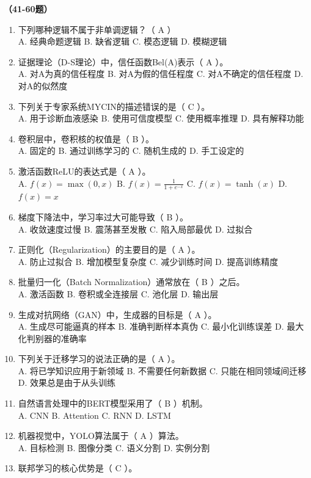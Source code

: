 \vspace{1em}
\textbf{（41-60题）}
\begin{enumerate}[resume,leftmargin=2em,itemsep=1pt]
\item 下列哪种逻辑不属于非单调逻辑？（ A ）
\\ A. 经典命题逻辑 B. 缺省逻辑 C. 模态逻辑 D. 模糊逻辑
\item 证据理论（D-S理论）中，信任函数Bel(A)表示（ A ）。
\\ A. 对A为真的信任程度 B. 对A为假的信任程度 C. 对A不确定的信任程度 D. 对A的似然度
\item 下列关于专家系统MYCIN的描述错误的是（ C ）。
\\ A. 用于诊断血液感染 B. 使用可信度模型 C. 使用概率推理 D. 具有解释功能
\item 卷积层中，卷积核的权值是（ B ）。
\\ A. 固定的 B. 通过训练学习的 C. 随机生成的 D. 手工设定的
\item 激活函数ReLU的表达式是（ A ）。
\\ A. $f(x) = \max(0, x)$ B. $f(x) = \frac{1}{1+e^{-x}}$ C. $f(x) = \tanh(x)$ D. $f(x) = x$
\item 梯度下降法中，学习率过大可能导致（ B ）。
\\ A. 收敛速度过慢 B. 震荡甚至发散 C. 陷入局部最优 D. 过拟合
\item 正则化（Regularization）的主要目的是（ A ）。
\\ A. 防止过拟合 B. 增加模型复杂度 C. 减少训练时间 D. 提高训练精度
\item 批量归一化（Batch Normalization）通常放在（ B ）之后。
\\ A. 激活函数 B. 卷积或全连接层 C. 池化层 D. 输出层
\item 生成对抗网络（GAN）中，生成器的目标是（ A ）。
\\ A. 生成尽可能逼真的样本 B. 准确判断样本真伪 C. 最小化训练误差 D. 最大化判别器的准确率
\item 下列关于迁移学习的说法正确的是（ A ）。
\\ A. 将已学知识应用于新领域 B. 不需要任何新数据 C. 只能在相同领域间迁移 D. 效果总是由于从头训练
\item 自然语言处理中的BERT模型采用了（ B ）机制。
\\ A. CNN B. Attention C. RNN D. LSTM
\item 机器视觉中，YOLO算法属于（ A ）算法。
\\ A. 目标检测 B. 图像分类 C. 语义分割 D. 实例分割
\item 联邦学习的核心优势是（ C ）。

\end{enumerate}
